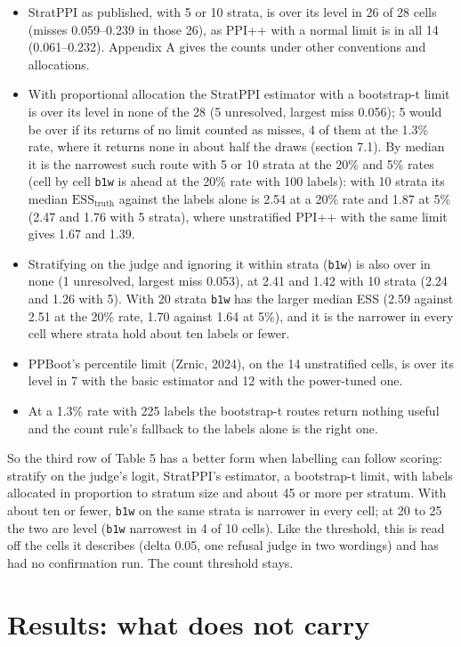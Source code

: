 \documentclass[11pt]{article}
\begin{document}
\begin{itemize}
\item StratPPI as published, with 5 or 10 strata, is over its level in 26 of 28 cells (misses 0.059--0.239 in those 26), as PPI++ with a normal limit is in all 14 (0.061--0.232). Appendix A gives the counts under other conventions and allocations.
\item With proportional allocation the StratPPI estimator with a bootstrap-t limit is over its level in none of the 28 (5 unresolved, largest miss 0.056); 5 would be over if its returns of no limit counted as misses, 4 of them at the 1.3\% rate, where it returns none in about half the draws (section 7.1). By median it is the narrowest such route with 5 or 10 strata at the 20\% and 5\% rates (cell by cell \texttt{b1w} is ahead at the 20\% rate with 100 labels): with 10 strata its median $\mathrm{ESS}_{\mathrm{truth}}$ against the labels alone is 2.54 at a 20\% rate and 1.87 at 5\% (2.47 and 1.76 with 5 strata), where unstratified PPI++ with the same limit gives 1.67 and 1.39.
\item Stratifying on the judge and ignoring it within strata (\texttt{b1w}) is also over in none (1 unresolved, largest miss 0.053), at 2.41 and 1.42 with 10 strata (2.24 and 1.26 with 5). With 20 strata \texttt{b1w} has the larger median ESS (2.59 against 2.51 at the 20\% rate, 1.70 against 1.64 at 5\%), and it is the narrower in every cell where strata hold about ten labels or fewer.
\item PPBoot's percentile limit (Zrnic, 2024), on the 14 unstratified cells, is over its level in 7 with the basic estimator and 12 with the power-tuned one.
\item At a 1.3\% rate with 225 labels the bootstrap-t routes return nothing useful and the count rule's fallback to the labels alone is the right one.
\end{itemize}

So the third row of Table 5 has a better form when labelling can follow scoring: stratify on the judge's logit, StratPPI's estimator, a bootstrap-t limit, with labels allocated in proportion to stratum size and about 45 or more per stratum. With about ten or fewer, \texttt{b1w} on the same strata is narrower in every cell; at 20 to 25 the two are level (\texttt{b1w} narrowest in 4 of 10 cells). Like the threshold, this is read off the cells it describes (delta 0.05, one refusal judge in two wordings) and has had no confirmation run. The count threshold stays.


\section{Results: what does not carry}
\end{document}
